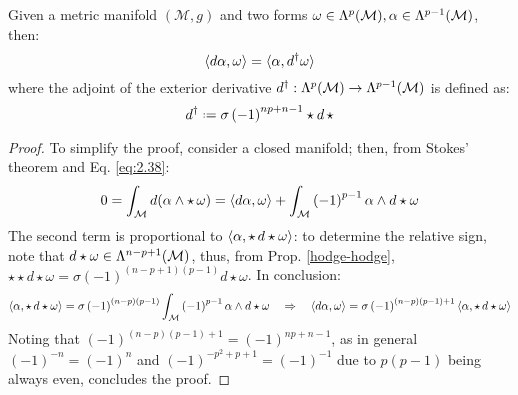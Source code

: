 \begin{proposition}
  Given a metric manifold $ (\mathcal{M},g) $ and two forms $ \omega \in \Lambda^{p}(\mathcal{M}), \alpha \in \Lambda^{p-1}(\mathcal{M}) $, then:
  \begin{equation}
    \braket{d\alpha,\omega} = \braket{\alpha,d^{\dagger}\omega}
    \label{eq:3.19}
  \end{equation}
  where the adjoint of the exterior derivative $ d^{\dagger} : \Lambda^{p}(\mathcal{M}) \rightarrow \Lambda^{p-1}(\mathcal{M}) $ is defined as:
  \begin{equation}
    d^{\dagger} \defeq \sigma \left( -1 \right)^{np + n -1} \star d \, \star
    \label{eq:3.20}
  \end{equation}
\end{proposition}
\begin{proof}
  To simplify the proof, consider a closed manifold; then, from Stokes' theorem and Eq. \ref{eq:2.38}:
  \begin{equation*}
    0 = \int_{\mathcal{M}} d ( \alpha \wedge \star\, \omega ) = \braket{d\alpha, \omega} + \int_{\mathcal{M}} \left( -1 \right)^{p-1} \alpha \wedge d \star \omega
  \end{equation*}
  The second term is proportional to $ \braket{\alpha, \star\, d \star \omega} $: to determine the relative sign, note that $ d \star \omega \in \Lambda^{n-p+1}(\mathcal{M}) $, thus, from Prop. \ref{hodge-hodge}, $ \star \star d \star \omega = \sigma \left( -1 \right)^{(n-p+1)(p-1)} d \star \omega $. In conclusion:
  \begin{equation*}
    \braket{\alpha, \star\, d \star \omega} = \sigma \left( -1 \right)^{(n-p)(p-1)} \int_{\mathcal{M}} \left( -1 \right)^{p-1} \alpha \wedge d \star \omega
    \quad \Rightarrow \quad
    \braket{d\alpha, \omega} = \sigma \left( -1 \right)^{(n-p)(p-1) + 1} \braket{\alpha, \star\, d \star \omega}
  \end{equation*}
  Noting that $ \left( -1 \right)^{(n-p)(p-1) + 1} = \left( -1 \right)^{np + n - 1} $, as in general $ \left( -1 \right)^{-n} = \left( -1 \right)^n $ and $ \left( -1 \right)^{-p^2 + p + 1} = \left( -1 \right)^{-1} $ due to $ p (p-1) $ being always even, concludes the proof.
\end{proof}










